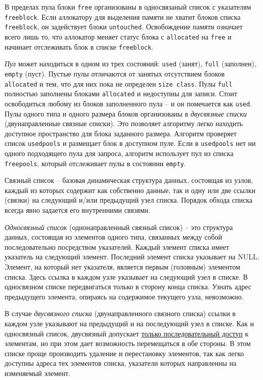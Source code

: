 \documentclass[%
	11pt,
	a4paper,
	utf8,
		]{article}
\begin{document}
В пределах пула блоки \texttt{free} организованы в односвязаный список с указателям \texttt{freeblock}. Если аллокатору для выделения памяти не хватит блоков списка \texttt{freeblock}, он задействует блоки \texttt{untouched}. Освобождение памяти означает всего лишь то, что аллокатор меняет статус блока с \texttt{allocated} на \texttt{free} и начинает отслеживать блок в списке \texttt{freeblock}.

\emph{Пул} может находиться в одном из трех состояний: \texttt{used} (занят), \texttt{full} (заполнен), \texttt{empty} (пуст). Пустые пулы отличаются от занятых отсутствием блоков \texttt{allocated} и тем, что для них пока не определен \texttt{size class}. Пулы \texttt{full} полностью заполнены блоками \texttt{allocated} и недоступны для записи. Стоит освободиться любому из блоков заполненного пула -- и он помечается как \texttt{used}. Пулы одного типа и одного размера блоков организованы в \emph{двусвязные списки} (двунаправленные связные списки). Это позволяет алгоритму легко находить доступное пространство для блока заданного размера. Алгоритм проверяет список \texttt{usedpools} и размещает блок в доступном пуле. Если в \texttt{usedpools} нет ни одного подходящего пула для запроса, алгоритм использует пул из списка \texttt{freepools}, который отслеживает пулы в состоянии \texttt{empty}.

Связный список -- базовая динамическая структура данных, состоящая из узлов, каждый из которых содержит как собственно данные, так и одну или две ссылки (связки) на следующий и/или предыдущий узел списка. Порядок обхода списка всегда явно задается его внутренними связями.

\emph{Односвязный список} (однонаправленный связный список) -- это структура данных, состоящая из элементов одного типа, связанных между собой последовательно посредством указателей. Каждый элемент списка имеет указатель на следующий элемент. Последний элемент списка указывает на NULL. Элемент, на который нет указателя, является первым (головным) элементом списка. Здесь ссылка в каждом узле указывает на следующий узел в списке. В односвязном списке передвигаться только в сторону конца списка. Узнать адрес предыдущего элемента, опираясь на содержимое текущего узла, невозможно.

В случае \emph{двусвязного списка} (двунаправленного связного списка) ссылки в каждом узле указывают на предыдущий и на последующий узел в списке. Как и односвязный список, двусвязный допускает \underline{только последовательный доступ} к элементам, но при этом дает возможность перемещаться в обе стороны. В этом списке проще производить удаление и перестановку элементов, так как легко доступны адреса тех элементов списка, указатели которых направленны на изменяемый элемент.
\end{document}
